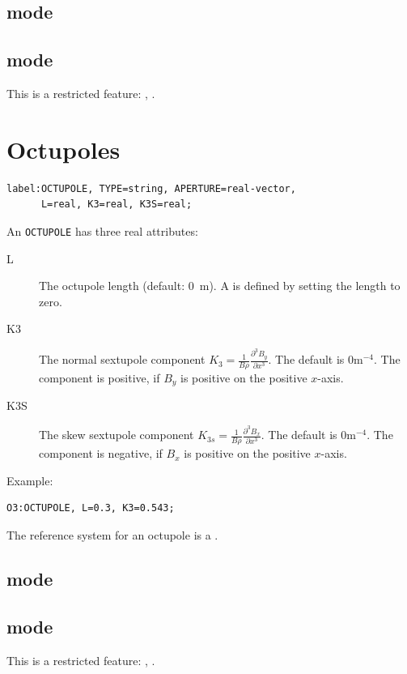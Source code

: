 \subsection{\opalt mode}

\subsection{\opalcycl mode}

This is a restricted feature: \noopalt, \noopalcycl .

\section{Octupoles}
\label{sec:octupole}
\begin{verbatim}
label:OCTUPOLE, TYPE=string, APERTURE=real-vector,
      L=real, K3=real, K3S=real;
\end{verbatim}
An \texttt{OCTUPOLE} has three real attributes:
\begin{description}
\item[L]
  The octupole length (default: 0~m).
  A  is defined by setting the length to zero.
\item[K3]
  The normal sextupole component
  $K_3=\frac{1}{B \rho}\frac{\partial^3 B_y}{\partial x^3}$.
  The default is $0 \mathrm{m}^{-4}$.
  The component is positive, if $B_y$ is positive on the positive $x$-axis.
\item[K3S]
  The skew sextupole component
  $K_{3s}=\frac{1}{B \rho}\frac{\partial^3 B_x}{\partial x^3}$.
  The default is $0 \mathrm{m}^{-4}$.
  The component is negative, if $B_x$ is positive on the positive $x$-axis.
\end{description}
\noindent Example:
\begin{verbatim}
O3:OCTUPOLE, L=0.3, K3=0.543;
\end{verbatim}
The reference system for an octupole is a 
.
\subsection{\opalt mode}

\subsection{\opalcycl mode}

This is a restricted feature: \noopalt, \noopalcycl .

